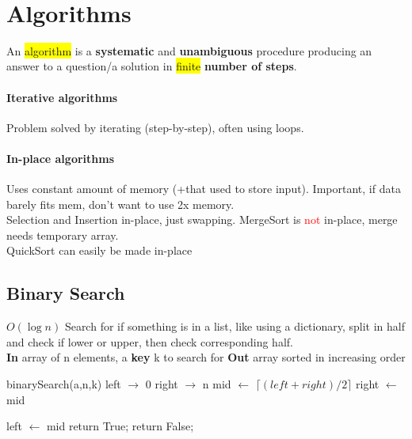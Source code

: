 \color{Blue}
~\vspace{-7 pt}
\section{Algorithms}
An \colorbox{Yellow}{algorithm} is a \textbf{systematic} and \textbf{unambiguous} procedure producing an answer to a question/a solution in \colorbox{Yellow}{finite} \textbf{number of steps}.
\vspace{-7 pt}
\paragraph{Iterative algorithms} Problem solved by iterating (step-by-step), often using loops.
\vspace{-7 pt}
\paragraph{In-place algorithms} Uses constant amount of memory (+that used to store input). Important, if data barely fits mem, don't want to use 2x memory.
\\ Selection and Insertion in-place, just swapping. MergeSort is \textcolor{Red}{not} in-place, merge needs temporary array.
\\ QuickSort can easily be made in-place
\subsection{Binary Search}$O(\log{n})$ Search for if something is in a list, like using a dictionary, split in half and check if lower or upper, then check corresponding half.\\ %
\textbf{In} array of n elements, a \textbf{key} k to search for \textbf{Out} array sorted in increasing order
\begin{algorithmic}
\State binarySearch(a,n,k)
\State left $\to$ 0
\State right $\to$ n
	\State mid $\gets$ $\lceil (left+right)/2 \rceil $
	 right $\gets$ mid 
	
	\Else left $\gets$ mid
	\EndIf
\EndWhile
{} return True;
\Else return False;
\EndIf
\end{algorithmic}
